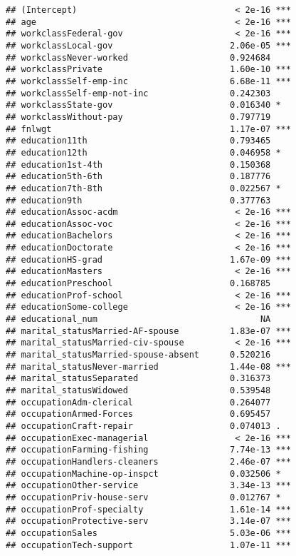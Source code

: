 \documentclass[]{article}
\begin{document}
\begin{verbatim}
## (Intercept)                               < 2e-16 ***
## age                                       < 2e-16 ***
## workclassFederal-gov                      < 2e-16 ***
## workclassLocal-gov                       2.06e-05 ***
## workclassNever-worked                    0.924684    
## workclassPrivate                         1.60e-10 ***
## workclassSelf-emp-inc                    6.68e-11 ***
## workclassSelf-emp-not-inc                0.242303    
## workclassState-gov                       0.016340 *  
## workclassWithout-pay                     0.797719    
## fnlwgt                                   1.17e-07 ***
## education11th                            0.793465    
## education12th                            0.046958 *  
## education1st-4th                         0.150368    
## education5th-6th                         0.187776    
## education7th-8th                         0.022567 *  
## education9th                             0.377763    
## educationAssoc-acdm                       < 2e-16 ***
## educationAssoc-voc                        < 2e-16 ***
## educationBachelors                        < 2e-16 ***
## educationDoctorate                        < 2e-16 ***
## educationHS-grad                         1.67e-09 ***
## educationMasters                          < 2e-16 ***
## educationPreschool                       0.168785    
## educationProf-school                      < 2e-16 ***
## educationSome-college                     < 2e-16 ***
## educational_num                                NA    
## marital_statusMarried-AF-spouse          1.83e-07 ***
## marital_statusMarried-civ-spouse          < 2e-16 ***
## marital_statusMarried-spouse-absent      0.520216    
## marital_statusNever-married              1.44e-08 ***
## marital_statusSeparated                  0.316373    
## marital_statusWidowed                    0.539548    
## occupationAdm-clerical                   0.264077    
## occupationArmed-Forces                   0.695457    
## occupationCraft-repair                   0.074013 .  
## occupationExec-managerial                 < 2e-16 ***
## occupationFarming-fishing                7.74e-13 ***
## occupationHandlers-cleaners              2.46e-07 ***
## occupationMachine-op-inspct              0.032506 *  
## occupationOther-service                  3.34e-13 ***
## occupationPriv-house-serv                0.012767 *  
## occupationProf-specialty                 1.61e-14 ***
## occupationProtective-serv                3.14e-07 ***
## occupationSales                          5.03e-06 ***
## occupationTech-support                   1.07e-11 ***

\end{verbatim}
\end{document}
